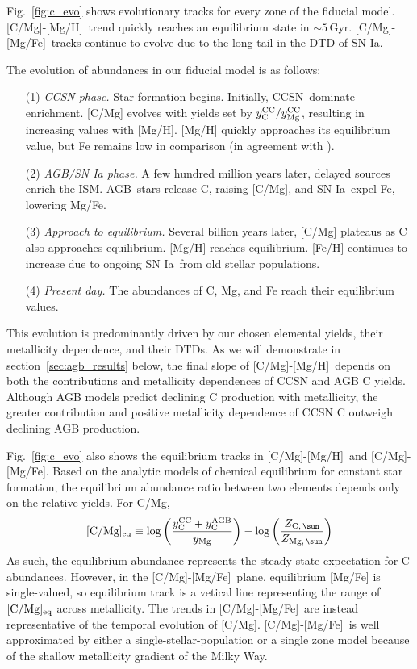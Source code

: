 \documentclass[fleqn,
referee, %
usenatbib]{mnras}
\makeatletter
\newcommand{\agb}{AGB}
\newcommand{\cc}{CCSN}
\newcommand{\ia}{SN Ia}
\newcommand{\caah}{[C/Mg]-[Mg/H]}
\newcommand{\caafe}{[C/Mg]-[Mg/Fe]}
\newcommand{\Ycc}{{y_{\rm C}^{\rm CC}}}
\newcommand{\Yoc}{{y_{\rm Mg}^{\rm CC}}}
\newcommand{\Ycagb}{{y_{\rm C}^{\rm AGB}}}
\newcommand{\about}[1]{${\sim} #1$}
\DeclareRobustCommand\citepos
  {\begingroup
   \let\NAT@nmfmt\NAT@posfmt%
   \NAT@swafalse\let\NAT@ctype\z@\NAT@partrue
   \@ifstar{\NAT@fulltrue\NAT@citetp}{\NAT@fullfalse\NAT@citetp}}
\let\NAT@orig@nmfmt\NAT@nmfmt
\def\NAT@posfmt#1{\NAT@orig@nmfmt{#1's}}
\makeatother
\begin{document}
Fig.~\ref{fig:c_evo} shows evolutionary tracks for every zone of the fiducial model.
\caah\ trend quickly reaches an equilibrium state in \about{5}\,Gyr. \caafe\ tracks continue to evolve due to the long tail in the DTD of \ia. 


The evolution of abundances in our fiducial model is as follows:
\begin{enumerate}
    \item[(1)] {\it CCSN phase.} Star formation begins. Initially, \cc\ dominate enrichment. [C/Mg] evolves with yields set by $\Ycc/\Yoc$, resulting in increasing values with [Mg/H].  [Mg/H] quickly approaches its equilibrium value, but Fe remains low in comparison (in agreement with \citealt{WAF17}).
    \item[(2)]  {\it AGB/SN Ia phase.} A few hundred million years later, delayed sources enrich the ISM. \agb\ stars release C, raising [C/Mg], and \ia\ expel Fe, lowering Mg/Fe. 
    \item[(3)] {\it Approach to equilibrium.} Several billion years later, [C/Mg] plateaus as C also approaches equilibrium. [Mg/H] reaches equilibrium. [Fe/H] continues to increase due to ongoing \ia\ from old stellar populations. 
    \item[(4)] {\it Present day.} The abundances of C, Mg, and Fe reach their equilibrium values. 

\end{enumerate}
This evolution is predominantly driven by our chosen elemental yields, their
metallicity dependence, and their DTDs.
As we will demonstrate in section~\ref{sec:agb_results} below, the final slope of \caah\ depends on both the contributions and metallicity dependences of CCSN and AGB C yields. Although AGB models predict declining C production with metallicity, the greater contribution and positive metallicity dependence of CCSN C outweigh declining AGB production.



 Fig.~\ref{fig:c_evo} also shows the  equilibrium tracks in \caah\, and \caafe. Based on the \citepos{WAF17} analytic models of chemical equilibrium for constant star formation, the equilibrium abundance ratio between two elements depends only on the relative yields. For C/Mg, 
\begin{equation}\label{eq:equilibrium_yields}
    {\rm [C/Mg]_{eq}} \equiv \log \left(\frac{\Ycc + \Ycagb }{y_{\rm Mg}}\right) - \log \left(\frac{Z_{\rm C,\,\sun}}{Z_{\rm Mg,\,\sun}}\right)
\end{equation}
As such, the equilibrium abundance represents the steady-state expectation for C abundances.  
However, in the \caafe\ plane, equilibrium [Mg/Fe] is single-valued, so equilibrium track is a vetical line representing the range of ${\rm [C/Mg]_{eq}}$ across metallicity. The trends in \caafe\ are instead representative of the temporal evolution of [C/Mg].  \caafe\ is well approximated by either a single-stellar-population or a single zone model because of the shallow metallicity gradient of the Milky Way. 
\end{document}
